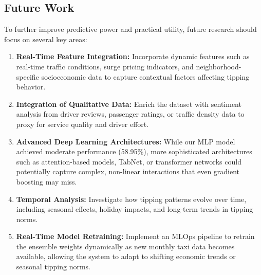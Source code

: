 \documentclass[11pt]{article}
\begin{document}
\subsection{Future Work}
To further improve predictive power and practical utility, future research should focus on several key areas:
\begin{enumerate}
    \item \textbf{Real-Time Feature Integration:} Incorporate dynamic features such as real-time traffic conditions, surge pricing indicators, and neighborhood-specific socioeconomic data to capture contextual factors affecting tipping behavior.
    \item \textbf{Integration of Qualitative Data:} Enrich the dataset with sentiment analysis from driver reviews, passenger ratings, or traffic density data to proxy for service quality and driver effort.
    \item \textbf{Advanced Deep Learning Architectures:} While our MLP model achieved moderate performance (58.95\%), more sophisticated architectures such as attention-based models, TabNet, or transformer networks could potentially capture complex, non-linear interactions that even gradient boosting may miss.
    \item \textbf{Temporal Analysis:} Investigate how tipping patterns evolve over time, including seasonal effects, holiday impacts, and long-term trends in tipping norms.
    \item \textbf{Real-Time Model Retraining:} Implement an MLOps pipeline to retrain the ensemble weights dynamically as new monthly taxi data becomes available, allowing the system to adapt to shifting economic trends or seasonal tipping norms.
\end{enumerate}

\nocite{*}

\end{document}
